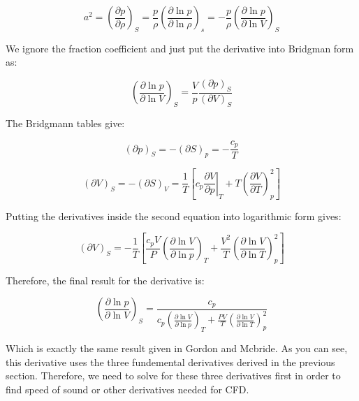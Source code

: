 \documentclass[10pt]{article}
\begin{document}
\begin{flushleft}
\begin{equation}
    a^2 = \left( \frac{\partial p}{\partial \rho} \right)_S = \frac{p}{\rho} \left( \frac{\partial \ln p}{\partial \ln \rho} \right)_s = -\frac{p}{\rho} \left( \frac{\partial \ln p}{\partial \ln V} \right)_S
\end{equation}

We ignore the fraction coefficient and just put the derivative into Bridgman form as:

\begin{equation}
    \left(\frac{\partial \ln p}{\partial \ln V}\right)_S = \frac{V}{p} \frac{(\partial p)_S}{(\partial V)_S}
\end{equation}

The Bridgmann tables give:

\begin{equation}
    (\partial p)_S = -(\partial S)_p = -\frac{c_p}{T}
\end{equation}

\begin{equation}
    (\partial V)_S = -(\partial S)_V = \frac{1}{T} \left[c_p \left.\frac{\partial V}{\partial p}\right|_T + T \left( \frac{\partial V}{\partial T}\right)_{p}^{2} \right]
\end{equation}

Putting the derivatives inside the second equation into logarithmic form gives:

\begin{equation}
        (\partial V)_S = -\frac{1}{T} \left[\frac{c_p V}{P} \left(\frac{\partial \ln V}{\partial \ln p}\right)_T + \frac{V^2}{T} \left( \frac{\partial \ln V}{\partial \ln T}\right)_{p}^{2} \right]
\end{equation}

Therefore, the final result for the derivative is:

\begin{equation}
    \left( \frac{\partial \ln p}{\partial \ln V} \right)_S = \frac{c_p}{c_p \left(\frac{\partial \ln V}{\partial \ln p}\right)_T + \frac{PV}{T} \left( \frac{\partial \ln V}{\partial \ln T} \right)_p^2}
\end{equation}

Which is exactly the same result given in Gordon and Mcbride. As you can see, this derivative uses the three fundemental derivatives derived in the previous section. Therefore, we need to solve for these three derivatives first in order to find speed of sound or other derivatives needed for CFD.



\end{flushleft}
\end{document}
